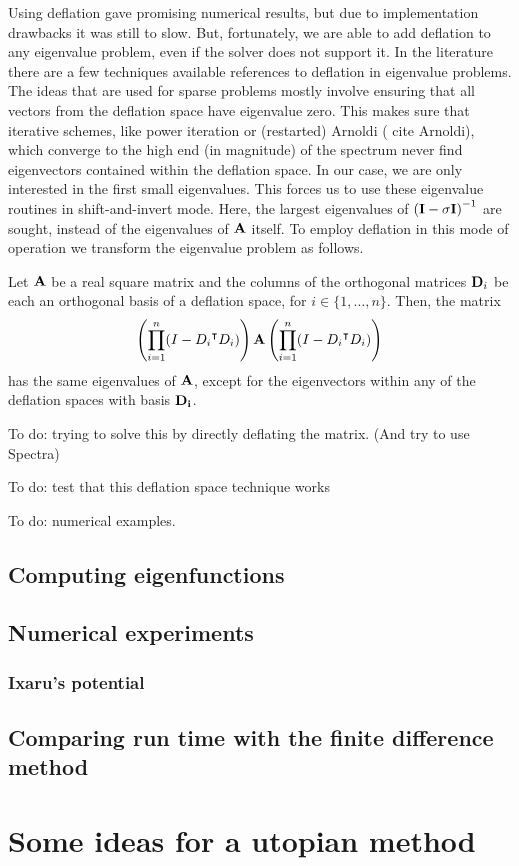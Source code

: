 Using deflation gave promising numerical results, but due to implementation drawbacks it was still to slow. But, fortunately, we are able to add deflation to any eigenvalue problem, even if the solver does not support it. In the literature there are a few techniques available {\color{red} references to deflation in eigenvalue problems}. The ideas that are used for sparse problems mostly involve ensuring that all vectors from the deflation space have eigenvalue zero. This makes sure that iterative schemes, like power iteration or (restarted) Arnoldi ({\color{red} cite Arnoldi}), which converge to the high end (in magnitude) of the spectrum never find eigenvectors contained within the deflation space. In our case, we are only interested in the first small eigenvalues. This forces us to use these eigenvalue routines in shift-and-invert mode. Here, the largest eigenvalues of $\left(\vb{I} - \sigma \vb{I}\right)^{-1}$ are sought, instead of the eigenvalues of $\vb{A}$ itself. To employ deflation in this mode of operation we transform the eigenvalue problem as follows.

\begin{theorem}
    Let $\vb{A}$ be a real square matrix and the columns of the orthogonal matrices $\vb{D}_i$ be each an orthogonal basis of a deflation space, for $i \in \{1, \dots, n\}$. Then, the matrix
    $$
    \left(\prod_{i=1}^{n}(I - {D_i}^\intercal D_i)\right) \vb{A} \left(\prod_{i=1}^{n}(I - {D_i}^\intercal D_i)\right)
    $$
    has the same eigenvalues of $\vb{A}$, except for the eigenvectors within any of the deflation spaces with basis $\vb{D_i}$.
\end{theorem}



    {\color{red}To do: trying to solve this by directly deflating the matrix. (And try to use Spectra)}

    {\color{red}To do: test that this deflation space technique works}

    {\color{red}To do: numerical examples}.

\subsection{Computing eigenfunctions}

\subsection{Numerical experiments}

\subsubsection{Ixaru's potential}\label{sec:c4_new_method_ixaru}

\subsection{Comparing run time with the finite difference method}\label{sec:c4_nm_vs_fd}

\section{Some ideas for a utopian method}\label{c4:sec_utopy}


\stopchapter
